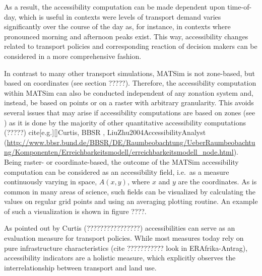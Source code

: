 As a result, the accessibility computation can be made dependent upon time-of-day, which is useful in contexts were levels of transport demand varies significantly over the course of the day as, for instance, in contexts where pronounced morning and afternoon peaks exist. This way, accessibility changes related to transport policies and corresponding reaction of decision makers can be considered in a more comprehensive fashion.

In contrast to many other transport simulations, MATSim is not zone-based, but based on coordinates (see section ?????). Therefore, the accessibility computation within MATSim can also be conducted independent of any zonation system and, instead, be based on points or on a raster with arbitrary granularity. This avoids several issues that may arise if accessibility computations are based on zones (see \citep[e.g.][]{NicolaiNagel2012HiResAccessibilityMethodInBook}) as it is done by the majority of other quantitative accessibility computations (?????) cite[e.g.][]{Curtis, BBSR , LiuZhu2004AccessibilityAnalyst} 
(\url{http://www.bbsr.bund.de/BBSR/DE/Raumbeobachtung/UeberRaumbeobachtung/Komponenten/Erreichbarkeitsmodell/erreichbarkeitsmodell_node.html}). Being raster- or coordinate-based, the outcome of the MATSim accessibility computation can be considered as an accessibility field,
i.e.\ as a measure continuously varying in space, $A(x,y)$, where $x$ and $y$
are the coordinates.  As is common in many areas of science, such
fields can be visualized by calculating the values on regular grid
points and using an averaging plotting routine. An example of such a visualization is shown in figure ????.

As pointed out by Curtis (????????????????) accessibilities can serve as an evaluation measure for transport policies. While most measures today rely on pure infrastructure characteristics (cite ??????????? look in ERAfrika-Antrag), accessibility indicators are a holistic measure, which explicitly observes the interrelationship between transport and land use.

